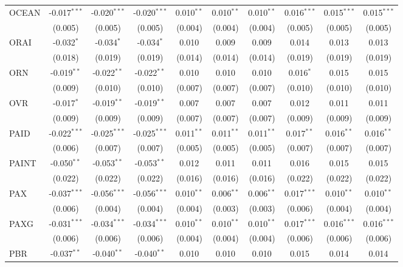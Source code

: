 \begin{table}[!htbp]
\begin{tabular}{@{\extracolsep{5pt}}lccccccccc}
 OCEAN & -0.017$^{***}$ & -0.020$^{***}$ & -0.020$^{***}$ & 0.010$^{**}$ & 0.010$^{**}$ & 0.010$^{**}$ & 0.016$^{***}$ & 0.015$^{***}$ & 0.015$^{***}$ \\
  & (0.005) & (0.005) & (0.005) & (0.004) & (0.004) & (0.004) & (0.005) & (0.005) & (0.005) \\
 ORAI & -0.032$^{*}$ & -0.034$^{*}$ & -0.034$^{*}$ & 0.010$^{}$ & 0.009$^{}$ & 0.009$^{}$ & 0.014$^{}$ & 0.013$^{}$ & 0.013$^{}$ \\
  & (0.018) & (0.019) & (0.019) & (0.014) & (0.014) & (0.014) & (0.019) & (0.019) & (0.019) \\
 ORN & -0.019$^{**}$ & -0.022$^{**}$ & -0.022$^{**}$ & 0.010$^{}$ & 0.010$^{}$ & 0.010$^{}$ & 0.016$^{*}$ & 0.015$^{}$ & 0.015$^{}$ \\
  & (0.009) & (0.010) & (0.010) & (0.007) & (0.007) & (0.007) & (0.010) & (0.010) & (0.010) \\
 OVR & -0.017$^{*}$ & -0.019$^{**}$ & -0.019$^{**}$ & 0.007$^{}$ & 0.007$^{}$ & 0.007$^{}$ & 0.012$^{}$ & 0.011$^{}$ & 0.011$^{}$ \\
  & (0.009) & (0.009) & (0.009) & (0.007) & (0.007) & (0.007) & (0.009) & (0.009) & (0.009) \\
 PAID & -0.022$^{***}$ & -0.025$^{***}$ & -0.025$^{***}$ & 0.011$^{**}$ & 0.011$^{**}$ & 0.011$^{**}$ & 0.017$^{**}$ & 0.016$^{**}$ & 0.016$^{**}$ \\
  & (0.006) & (0.007) & (0.007) & (0.005) & (0.005) & (0.005) & (0.007) & (0.007) & (0.007) \\
 PAINT & -0.050$^{**}$ & -0.053$^{**}$ & -0.053$^{**}$ & 0.012$^{}$ & 0.011$^{}$ & 0.011$^{}$ & 0.016$^{}$ & 0.015$^{}$ & 0.015$^{}$ \\
  & (0.022) & (0.022) & (0.022) & (0.016) & (0.016) & (0.016) & (0.022) & (0.022) & (0.022) \\
 PAX & -0.037$^{***}$ & -0.056$^{***}$ & -0.056$^{***}$ & 0.010$^{**}$ & 0.006$^{**}$ & 0.006$^{**}$ & 0.017$^{***}$ & 0.010$^{**}$ & 0.010$^{**}$ \\
  & (0.006) & (0.004) & (0.004) & (0.004) & (0.003) & (0.003) & (0.006) & (0.004) & (0.004) \\
 PAXG & -0.031$^{***}$ & -0.034$^{***}$ & -0.034$^{***}$ & 0.010$^{**}$ & 0.010$^{**}$ & 0.010$^{**}$ & 0.017$^{***}$ & 0.016$^{***}$ & 0.016$^{***}$ \\
  & (0.006) & (0.006) & (0.006) & (0.004) & (0.004) & (0.004) & (0.006) & (0.006) & (0.006) \\
 PBR & -0.037$^{**}$ & -0.040$^{**}$ & -0.040$^{**}$ & 0.010$^{}$ & 0.010$^{}$ & 0.010$^{}$ & 0.015$^{}$ & 0.014$^{}$ & 0.014$^{}$ \\

\end{tabular}
\end{table}
